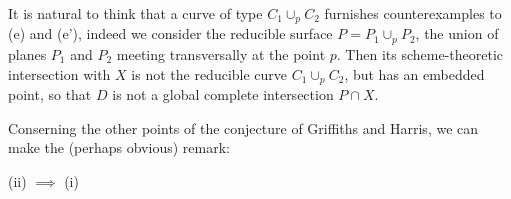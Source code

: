 \documentclass[12pt]{article}
\begin{document}
\begin{rmk}
It is natural to think that a curve of type $C_1 \cup_p C_2$ furnishes counterexamples to (e) and (e'), indeed we consider the reducible surface $P = P_1 \cup_p P_2$, the union of planes $P_1$ and $P_2$ meeting transversally at the point $p$.  Then its scheme-theoretic intersection with $X$ is not the reducible curve $C_1 \cup_p C_2$, but has an embedded point, so that $D$ is not a global complete intersection $P \cap X$. 
\end{rmk}

Conserning the other points of the conjecture of Griffiths and Harris, we can make the (perhaps obvious) remark:

\begin{lemma}
(ii) $\implies$ (i)
\end{lemma}
\end{document}
